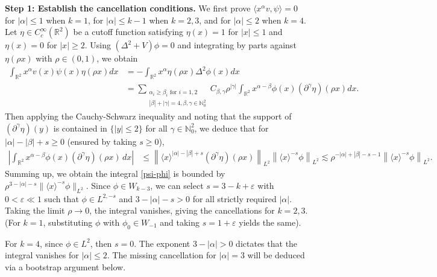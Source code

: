 \documentclass[reqno]{amsart}
\numberwithin{equation}{section}
\begin{document}
\textbf{Step 1: Establish the cancellation conditions.} 
We first prove $\langle x^{\alpha}v, \psi\rangle=0$ for $|\alpha| \leq 1$ when ${k}=1$, for $|\alpha| \leq {k}-1$ when ${k}=2,3$, and for $|\alpha| \leq 2$ when ${k}=4$.
Let $\eta \in C_c^\infty(\mathbb{R}^2)$ be a cutoff function satisfying $\eta(x) = 1$ for $|x| \le 1$ and $\eta(x) = 0$ for $|x| \ge 2$.  Using $(\Delta^2 + V)\phi = 0$ and integrating by parts against $\eta(\rho x)$ with $\rho \in (0,1)$, we obtain
\begin{align}
	\int_{\mathbb{R}^2} x^\alpha v(x) \psi(x) \eta(\rho x)  d x
	&= -\int_{\mathbb{R}^2} x^\alpha \eta(\rho x) \Delta^2 \phi(x)  d x \nonumber\\\label{psi-phi}
	&= \sum_{\substack{\alpha_i \geq \beta_i \text{ for } i=1,2 \\ |\beta|+|\gamma|=4, \beta, \gamma \in \mathbb{N}_0^2}} C_{\beta, \gamma}  \rho^{|\gamma|} \int_{\mathbb{R}^2} x^{\alpha-\beta} \phi(x) (\partial^\gamma \eta)(\rho x)  d x.
\end{align}
Then applying the Cauchy-Schwarz inequality and noting that the support of $(\partial^\gamma \eta)(y)$ is contained in $\{ |y| \le 2\}$ for all $\gamma\in \mathbb{N}_0^2$, we deduce that for $|\alpha|-|\beta|+s \ge 0$ (ensured by taking $s \ge 0$),
\begin{align*}
	\left| \int_{\mathbb{R}^2} x^{\alpha-\beta} \phi(x) (\partial^\gamma \eta)(\rho x) \, dx \right| 
	&\le \left\| \langle x\rangle^{|\alpha|-|\beta|+s} (\partial^\gamma \eta)(\rho x) \right\|_{L^2} \left\| \langle x\rangle^{-s} \phi \right\|_{L^2} \lesssim \rho^{-|\alpha|+|\beta|-s-1} \left\| \langle x\rangle^{-s} \phi \right\|_{L^2}.
\end{align*}
Summing up, we obtain the integral \eqref{psi-phi} is  bounded by $\rho^{3-|\alpha|-s} \| \langle x\rangle^{-s} \phi \|_{L^2}$. 
Since $\phi \in W_{{k}-3}$, we can select $s = 3 - {k} + \varepsilon$ with $0 < \varepsilon \ll 1$ such that $\phi \in L^{2,-s}$ and $3 - |\alpha| - s > 0$ for all strictly required $|\alpha|$. Taking the limit $\rho \to 0$, the integral vanishes, giving the cancellations for ${k}=2,3$. (For ${k}=1$, substituting $\phi$ with $\phi_0 \in W_{-1}$ and taking $s=1+\varepsilon$ yields the same).


For ${k}=4$, since $\phi \in L^2$, then $s=0$. The exponent $3 - |\alpha| > 0$ dictates that the integral vanishes for $|\alpha| \le 2$. The missing cancellation for $|\alpha|=3$ will be deduced via a bootstrap argument below.
\end{document}
